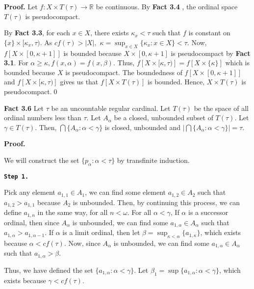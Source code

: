 \documentclass{article}
\begin{document}
\textbf{Proof.} Let $f: X\times T(\tau)\rightarrow \mathbb{R}$ be continuous. By \textbf{Fact 3.4} , the ordinal space $T(\tau)$ is pseudocompact.
\vskip 10pt 

By \textbf{Fact 3.3}, for each $x\in X$, there exists $\kappa_x<\tau$ such that $f$ is constant on $\{x\}\times [\kappa_x, \tau)$. 
As $cf(\tau)>|X|,$  $\kappa=\sup_{x\in X} \{\kappa_x: x\in X\}<\tau.$ 
Now, $f\left[X\times [0,\kappa+1]\right]$ is bounded because $X\times [0,\kappa+1]$ is pseudocompact by \textbf{Fact 3.1}.
For $\alpha\geq \kappa, f(x,\alpha)=f(x,\beta).$ Thus, $f\left[X\times [\kappa,\tau)\right]=f\left[X\times\{\kappa\}\right]$ which is bounded because $X$ is pseudocompact. The boundedness of $f\left[X\times [0,\kappa+1]\right]$ and $f\left[X\times [\kappa,\tau)\right]$ gives us that $f\left[X\times T(\tau)\right]$ is bounded. Hence, $X\times T(\tau)$ is pseudocompact.\qed






\vskip 40pt



\textbf{Fact 3.6} Let $\tau$ be an uncountable regular cardinal. Let $T(\tau)$ be the space 
of all ordinal numbers less than $\tau$. Let $A_\alpha$ be a closed, unbounded subset of $T(\tau)$. Let $\gamma\in T(\tau).$ Then, $\bigcap \{A_\alpha : \alpha<\gamma\}$ is closed, unbounded and $\left| \bigcap \{A_\alpha: \alpha<\gamma\} \right|=\tau$.



\vskip 15pt
\textbf{Proof.} 

We will construct the set $\{p_\alpha: \alpha<\tau\}$ by transfinite induction.

\vskip 10pt
\texttt{\textbf{Step 1.}}

Pick any element $a_{1,1}\in A_1$, we can find some element $a_{1,2}\in A_2$ such that $a_{1,2}>a_{1,1}$ because $A_2$ is unbounded. Then, 
by continuing this process, we can define $a_{1,n}$ in the same way, for all $n<\omega$. 
For all $\alpha<\gamma$,
If $\alpha$ is a successor ordinal, then since $A_\alpha$ is unbounded, we can find some $a_{1,\alpha} \in A_\alpha$ such that $a_{1,\alpha}>a_{1,\alpha-1}$. If $\alpha$ is a limit ordinal, then let $\beta=\sup_{\kappa<\alpha} \{a_{1,\kappa}\}$, which exists because $\alpha<cf(\tau)$. Now, since $A_\alpha$ is unbounded, we can find some $a_{1,\alpha}\in A_\alpha$ such that $a_{1,\alpha} >  \beta$.

Thus, we have defined the set $\{a_{1,\alpha}: \alpha <\gamma\}$. Let $\beta_1=\sup\{a_{1,\alpha}: \alpha <\gamma\}$, which exists because $\gamma<cf(\tau)$. 
\end{document}
